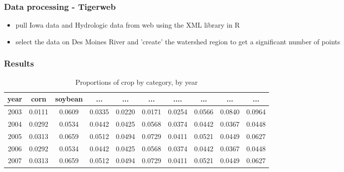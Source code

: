 \documentclass[xcolor=pdftex,dvipsnames,table]{beamer}
\begin{document}

\begin{frame}
\frametitle{Data processing - Tigerweb}

\begin{itemize}
\item pull Iowa data and Hydrologic data from web using the XML library in R
\item select the data on Des Moines River and 'create' the watershed region to get a significant number of points
\end{itemize}
\end{frame}


\begin{frame}
\frametitle{Results}

\begin{table}[ht]
\tiny
\begin{center}
\caption{Proportions of crop by category, by year}
\begin{tabular}{cccccccccc}
  \hline
year  & corn & soybean & ... & ... & ... & .... & ... & ... & ... \\ 
  \hline
2003 & 0.0111 & 0.0609 & 0.0335 & 0.0220 & 0.0171 & 0.0254 & 0.0566 & 0.0840 & 0.0964 \\ 
2004 & 0.0292 & 0.0534 & 0.0442 & 0.0425 & 0.0568 & 0.0374 & 0.0442 & 0.0367 & 0.0448 \\ 
2005 & 0.0313 & 0.0659 & 0.0512 & 0.0494 & 0.0729 & 0.0411 & 0.0521 & 0.0449 & 0.0627 \\ 
2006 & 0.0292 & 0.0534 & 0.0442 & 0.0425 & 0.0568 & 0.0374 & 0.0442 & 0.0367 & 0.0448 \\ 
2007 & 0.0313 & 0.0659 & 0.0512 & 0.0494 & 0.0729 & 0.0411 & 0.0521 & 0.0449 & 0.0627 \\ 
\hline
\end{tabular}
\end{center}
\end{table}
\end{frame}

\end{document}
